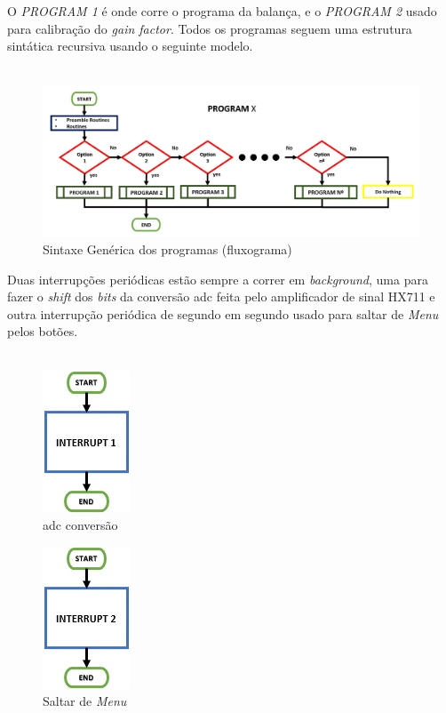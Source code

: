 O \textit{PROGRAM 1} é onde corre o programa da balança, e o \textit{PROGRAM 2} usado para calibração do \textit{gain factor}.
\newpage
Todos os programas seguem uma estrutura sintática recursiva usando o seguinte modelo.
\\
\\
\begin{figure}[H]
	\centering
	\includegraphics[width=\linewidth]{./image/PESTA/flowchart/Generic_structure.jpg}
	\caption{Sintaxe Genérica dos programas (fluxograma)}
	\label{Geneic_structure}
\end{figure}
Duas interrupções periódicas estão sempre a correr em \textit{background}, uma para fazer o \textit{shift} dos \textit{bits} da conversão \acs{adc} feita pelo amplificador de sinal HX711 e outra interrupção periódica de segundo em segundo usado para saltar de \textit{Menu} pelos botões.
\\
\\
\begin{minipage}{\linewidth}
\begin{minipage}{.5\linewidth}
\begin{figure}[H]
	\centering
	\includegraphics[scale=.85]{./image/PESTA/flowchart/Interrupt_1.jpg}
	\caption{\acs{adc} conversão}
	\label{Interrupt_1}
\end{figure}
\end{minipage}
\begin{minipage}{.5\linewidth}
\begin{figure}[H]
	\centering
	\includegraphics[scale=.85]{./image/PESTA/flowchart/Interrupt_2.jpg}
	\caption{Saltar de \textit{Menu}}
	\label{Interrupt_2}
\end{figure}
\end{minipage}
\end{minipage}
